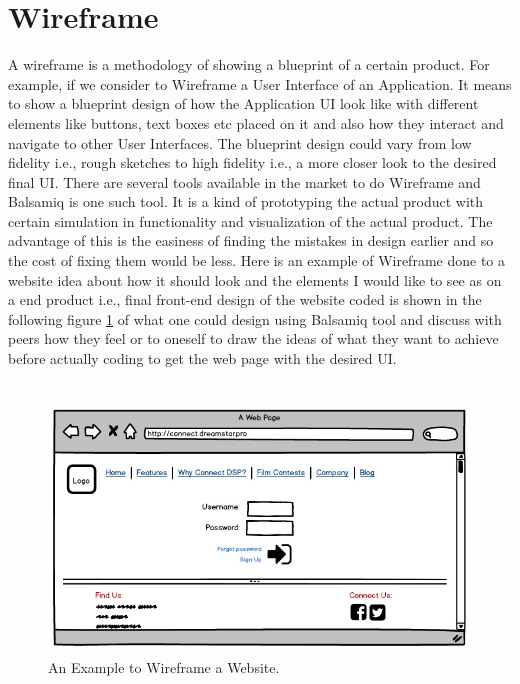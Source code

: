 \clearpage

\section{Wireframe}

A wireframe is a methodology of showing a blueprint of a certain product. For example, if we consider to Wireframe a User Interface of an Application. It means to show a blueprint design of how the Application UI look like with different elements like buttons, text boxes etc placed on it and also how they interact and navigate to other User Interfaces. The blueprint design could vary from low fidelity i.e., rough sketches to high fidelity i.e., a more closer look to the desired final UI. There are several tools available in the market to do Wireframe and Balsamiq \cite{B} is one such tool. It is a kind of prototyping the actual product with certain simulation in functionality and visualization of the actual product. The advantage of this is the easiness of finding the mistakes in design earlier and so the cost of fixing them would be less. Here is an example of Wireframe done to a website idea about how it should look and the elements I would like to see as on a end product i.e., final front-end  design of the website coded is shown in the following figure \ref{fig:wireframe_website} of what one could design using Balsamiq tool and discuss with peers how they feel or to oneself to draw the ideas of what they want to achieve before actually coding to get the web page with the desired UI. \\ \\

\begin{figure}[hbt!]
	\centering
	\includegraphics[width=\linewidth]{figures/Connect_DSP}
	\caption{An Example to Wireframe a Website.\cite{B}}
	\label{fig:wireframe_website}
\end{figure}

